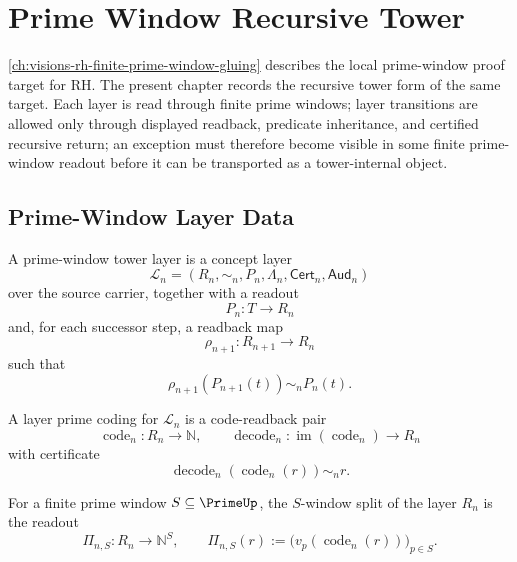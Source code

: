 \chapter{Prime Window Recursive Tower}
\label{ch:visions-rh-prime-window-recursive-tower}

\autoref{ch:visions-rh-finite-prime-window-gluing} describes the local
prime-window proof target for RH. The present chapter records the recursive
tower form of the same target. Each layer is read through finite prime
windows; layer transitions are allowed only through displayed readback,
predicate inheritance, and certified recursive return; an exception must
therefore become visible in some finite prime-window readout before it can
be transported as a tower-internal object.


\section{Prime-Window Layer Data}
\label{sec:rh-prime-window-layer-data}

\begin{definition}
\label{def:rh-prime-window-tower-layer}
A prime-window tower layer is a concept layer
$$
\mathcal L_n=(R_n,\sim_n,P_n,\Lambda_n,\mathsf{Cert}_n,\mathsf{Aud}_n)
$$
over the source carrier, together with a readout
$$
P_n:T\to R_n
$$
and, for each successor step, a readback map
$$
\rho_{n+1}:R_{n+1}\to R_n
$$
such that
$$
\rho_{n+1}(P_{n+1}(t))\sim_n P_n(t).
$$
\end{definition}

\begin{definition}
\label{def:rh-layer-prime-coding}
A layer prime coding for $\mathcal L_n$ is a code-readback pair
$$
\operatorname{code}_n:R_n\to\mathbb N,
\qquad
\operatorname{decode}_n:\operatorname{im}(\operatorname{code}_n)\to R_n
$$
with certificate
$$
\operatorname{decode}_n(\operatorname{code}_n(r))\sim_n r.
$$
\end{definition}

\begin{definition}
\label{def:rh-layer-prime-window-split}
For a finite prime window $S\subseteq\PrimeUp$, the $S$-window split of
the layer $R_n$ is the readout
$$
\Pi_{n,S}:R_n\to\mathbb N^{S},
\qquad
\Pi_{n,S}(r):=\bigl(v_p(\operatorname{code}_n(r))\bigr)_{p\in S}.
$$
\end{definition}


